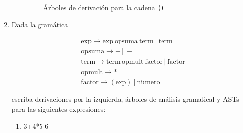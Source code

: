 \documentclass[a4paper, twoside, 12pt]{article}
\begin{document}
\begin{enumerate}
\begin{enumerate}
\begin{figure}[H]
        \caption{Árboles de derivación para la cadena \texttt{()}}
        \end{figure}
    \end{enumerate}

    \item Dada la gramática

    \begin{align*}
        &\mathrm{exp} \rightarrow \mathrm{exp} \ \mathrm{opsuma} \ \mathrm{term} \ | \ \mathrm{term} \\
        &\mathrm{opsuma} \rightarrow + \ | \ - \\
        &\mathrm{term} \rightarrow \mathrm{term} \ \mathrm{opmult} \ \mathrm{factor} \ | \ \mathrm{factor} \\
        &\mathrm{opmult} \rightarrow * \\
        &\mathrm{factor} \rightarrow (\mathrm{exp}) \ | \ \mathrm{n\acute{u}mero}
    \end{align*}

    escriba derivaciones por la izquierda, árboles de análisis gramatical y ASTs para las siguientes expresiones:

    \begin{enumerate}
        \item 3+4*5-6


\end{enumerate}
\end{enumerate}
\end{document}
